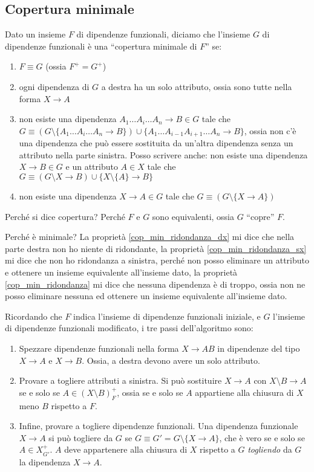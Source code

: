 \subsection{Copertura minimale}

Dato un insieme $F$ di dipendenze funzionali, diciamo che l'insieme $G$ di dipendenze funzionali \`e una ``copertura minimale di $F$'' se:
\begin{enumerate}
    \item \label{cop_minim_equivalenza} $F \equiv G$ (ossia $F^+ = G^+$)
    \item \label{cop_min_ridondanza_dx} ogni dipendenza di $G$ a destra ha un solo attributo, ossia sono tutte nella forma $X \to A$
    \item \label{cop_min_ridondanza_sx} non esiste una dipendenza $A_1 \ldots A_i \ldots A_n \to B \in G$ tale che $G \equiv (G \setminus \{ A_1 \ldots A_i \ldots A_n \to B \}) \cup \{A_1 \ldots A_{i-1} A_{i+1} \ldots A_n \to B \}$, ossia non c'\`e una dipendenza che pu\`o essere sostituita da un'altra dipendenza senza un attributo nella parte sinistra. Posso scrivere anche: non esiste una dipendenza $X \to B \in G$ e un attributo $A \in X$ tale che $G \equiv (G \setminus{ X \to B}) \cup \{ X \setminus \{A\} \to B \}$
    \item \label{cop_min_ridondanza} non esiste una dipendenza $X \to A \in G$ tale che $G \equiv (G \setminus \{X \to A\})$
\end{enumerate}

Perch\'e si dice copertura? Perch\'e $F$ e $G$ sono equivalenti, ossia $G$ ``copre'' $F$.

Perch\'e \`e minimale? La propriet\`a \ref{cop_min_ridondanza_dx} mi dice che nella parte destra non ho niente di ridondante, la propriet\`a \ref{cop_min_ridondanza_sx} mi dice che non ho ridondanza a sinistra, perch\'e non posso eliminare un attributo e ottenere un insieme equivalente all'insieme dato, la propriet\`a \ref{cop_min_ridondanza} mi dice che nessuna dipendenza \`e di troppo, ossia non ne posso eliminare nessuna ed ottenere un insieme equivalente all'insieme dato.

Ricordando che $F$ indica l'insieme di dipendenze funzionali iniziale, e $G$ l'insieme di dipendenze funzionali modificato, i tre passi dell'algoritmo sono:
\begin{enumerate}
    \item Spezzare dipendenze funzionali nella forma $X \to AB$ in dipendenze del tipo $X \to A$ e $X \to B$. Ossia, a destra devono avere un solo attributo.
    \item Provare a togliere attributi a sinistra. Si pu\`o sostituire $X \to A$ con $X \setminus B \to A$ se e solo se $A \in (X \setminus B)^+_F$, ossia se e solo se $A$ appartiene alla chiusura di $X$ meno $B$ rispetto a $F$.
    \item Infine, provare a togliere dipendenze funzionali. Una dipendenza funzionale $X \to A$ si pu\`o togliere da $G$ se $G \equiv G' = G \setminus \{ X \to A \}$, che \`e vero se e solo se $A \in X^+_{G'}$. $A$ deve appartenere alla chiusura di $X$ rispetto a $G$ \emph{togliendo} da $G$ la dipendenza $X \to A$.
\end{enumerate}

